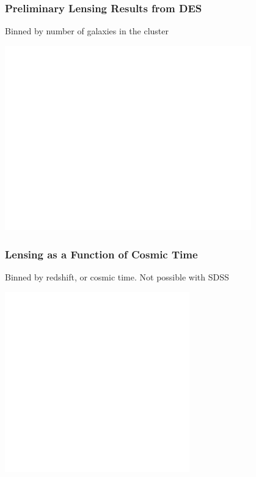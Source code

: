 \documentclass{beamer}
\begin{document}
\frame
{

    \frametitle{Preliminary Lensing Results from DES}
 
    \begin{minipage}{\linewidth}
        \vspace{5mm}
        Binned by number of galaxies in the cluster
        \vspace{5mm}
    \end{minipage}

    \begin{minipage}{\linewidth}
        \centering
        \includegraphics[width=0.8\textwidth]{run-rm008-bin-lbin12-zwide-jack-icolor.pdf}
    \end{minipage}

}


\frame
{

    \frametitle{Lensing as a Function of Cosmic Time}
 
    \begin{minipage}{\linewidth}
        \vspace{5mm}
        Binned by redshift, or cosmic time.  {\color{gold} Not possible with SDSS }
        \vspace{5mm}
    \end{minipage}
    \begin{minipage}{\linewidth}
        \centering
        \includegraphics[width=0.6\textwidth]{run-rm008-bin-lgt05-zbin4-jack-icolor.pdf}
    \end{minipage}

}
\end{document}

